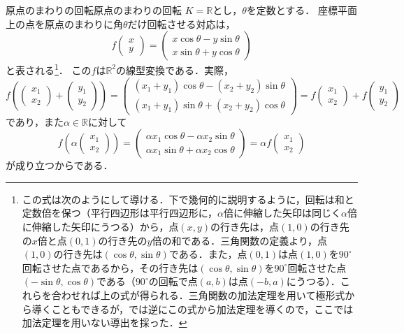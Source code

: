 \begin{example}{原点のまわりの回転}{原点のまわりの回転}
  $K = \mathbb{R}$とし，$\theta$を定数とする．
  座標平面上の点を原点のまわりに角$\theta$だけ回転させる対応は，
  \[
    f\begin{pmatrix} x \\ y \end{pmatrix}
    = \begin{pmatrix} x\cos\theta - y\sin\theta \\ x\sin\theta + y\cos\theta \end{pmatrix}
  \]
  と表される\footnote{この式は次のようにして導ける．下で幾何的に説明するように，回転は和と定数倍を保つ（平行四辺形は平行四辺形に，$\alpha$倍に伸縮した矢印は同じく$\alpha$倍に伸縮した矢印にうつる）から，点$(x, y)$の行き先は，点$(1, 0)$の行き先の$x$倍と点$(0, 1)$の行き先の$y$倍の和である．三角関数の定義より，点$(1, 0)$の行き先は$(\cos\theta, \sin\theta)$である．また，点$(0, 1)$は点$(1, 0)$を$90^\circ$回転させた点であるから，その行き先は$(\cos\theta, \sin\theta)$を$90^\circ$回転させた点$(-\sin\theta, \cos\theta)$である（$90^\circ$の回転で点$(a, b)$は点$(-b, a)$にうつる）．これらを合わせれば上の式が得られる．三角関数の加法定理を用いて極形式から導くこともできるが，では逆にこの式から加法定理を導くので，ここでは加法定理を用いない導出を採った．}．
  この$f$は$\mathbb{R}^2$の線型変換である．実際，
  \[
    f\left( \begin{pmatrix} x_1 \\ x_2 \end{pmatrix} + \begin{pmatrix} y_1 \\ y_2 \end{pmatrix} \right)
    = \begin{pmatrix} (x_1 + y_1)\cos\theta - (x_2 + y_2)\sin\theta \\ (x_1 + y_1)\sin\theta + (x_2 + y_2)\cos\theta \end{pmatrix}
    = f\begin{pmatrix} x_1 \\ x_2 \end{pmatrix} + f\begin{pmatrix} y_1 \\ y_2 \end{pmatrix}
  \]
  であり，また$\alpha \in \mathbb{R}$に対して
  \[
    f\left( \alpha \begin{pmatrix} x_1 \\ x_2 \end{pmatrix} \right)
    = \begin{pmatrix} \alpha x_1 \cos\theta - \alpha x_2 \sin\theta \\ \alpha x_1 \sin\theta + \alpha x_2 \cos\theta \end{pmatrix}
    = \alpha f\begin{pmatrix} x_1 \\ x_2 \end{pmatrix}
  \]
  が成り立つからである．
  \par\medskip


\end{example}
